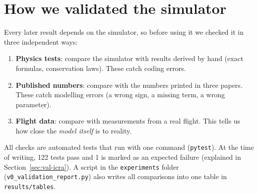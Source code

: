 \section{How we validated the simulator}\label{sec:validation}
Every later result depends on the simulator, so before using it we checked it in three independent ways:
\begin{enumerate}
  \item \textbf{Physics tests}: compare the simulator with results derived by hand (exact formulas, conservation laws). These catch coding errors.
  \item \textbf{Published numbers}: compare with the numbers printed in three papers. These catch modelling errors (a wrong sign, a missing term, a wrong parameter).
  \item \textbf{Flight data}: compare with measurements from a real flight. This tells us how close the \emph{model itself} is to reality.
\end{enumerate}
All checks are automated tests that run with one command (\texttt{pytest}). At the time of writing, 122 tests pass and 1 is marked as an expected failure (explained in Section~\ref{sec:val-icra}). A script in the \texttt{experiments} folder (\texttt{v0\_validation\_report.py}) also writes all comparisons into one table in \texttt{results/tables}.

